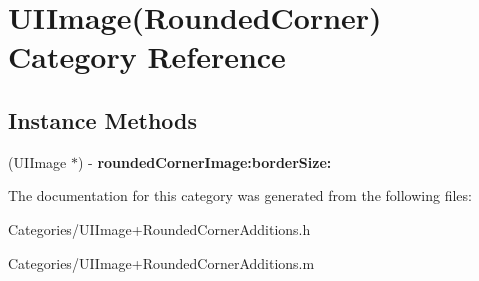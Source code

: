 \hypertarget{category_u_i_image_07_rounded_corner_08}{}\section{U\+I\+Image(Rounded\+Corner) Category Reference}
\label{category_u_i_image_07_rounded_corner_08}
\subsection*{Instance Methods}
\begin{DoxyCompactItemize}
\item 
\hypertarget{category_u_i_image_07_rounded_corner_08_a14b19e23e0d080d081db33948e35c4ad}{}(U\+I\+Image $\ast$) -\/ {\bfseries rounded\+Corner\+Image\+:border\+Size\+:}\label{category_u_i_image_07_rounded_corner_08_a14b19e23e0d080d081db33948e35c4ad}

\end{DoxyCompactItemize}


The documentation for this category was generated from the following files\+:\begin{DoxyCompactItemize}
\item 
Categories/U\+I\+Image+\+Rounded\+Corner\+Additions.\+h\item 
Categories/U\+I\+Image+\+Rounded\+Corner\+Additions.\+m\end{DoxyCompactItemize}
